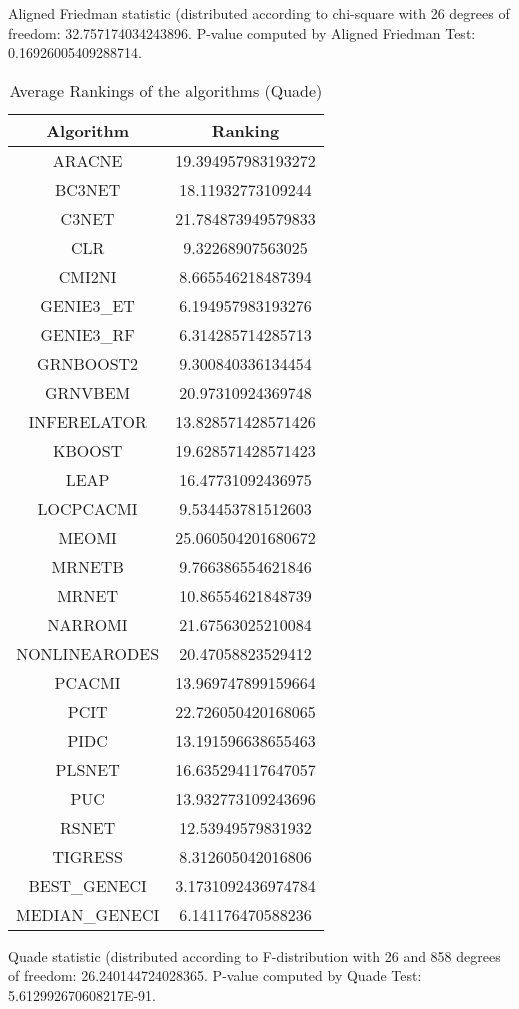 \documentclass[a4paper,10pt]{article}
\begin{document}
\begin{landscape}
Aligned Friedman statistic (distributed according to chi-square with 26 degrees of freedom: 32.757174034243896. 
P-value computed by Aligned Friedman Test: 0.16926005409288714.\newline


\newpage

\begin{table}[!htp]
\centering
\caption{Average Rankings of the algorithms (Quade)
}\begin{tabular}{c|c}
Algorithm&Ranking\\
\hline
ARACNE&19.394957983193272\\
BC3NET&18.11932773109244\\
C3NET&21.784873949579833\\
CLR&9.32268907563025\\
CMI2NI&8.665546218487394\\
GENIE3_ET&6.194957983193276\\
GENIE3_RF&6.314285714285713\\
GRNBOOST2&9.300840336134454\\
GRNVBEM&20.97310924369748\\
INFERELATOR&13.828571428571426\\
KBOOST&19.628571428571423\\
LEAP&16.47731092436975\\
LOCPCACMI&9.534453781512603\\
MEOMI&25.060504201680672\\
MRNETB&9.766386554621846\\
MRNET&10.86554621848739\\
NARROMI&21.67563025210084\\
NONLINEARODES&20.47058823529412\\
PCACMI&13.969747899159664\\
PCIT&22.726050420168065\\
PIDC&13.191596638655463\\
PLSNET&16.635294117647057\\
PUC&13.932773109243696\\
RSNET&12.53949579831932\\
TIGRESS&8.312605042016806\\
BEST_GENECI&3.1731092436974784\\
MEDIAN_GENECI&6.141176470588236\\
\end{tabular}
\end{table}
Quade statistic (distributed according to F-distribution with 26 and 858 degrees of freedom: 26.240144724028365. 
P-value computed by Quade Test: 5.612992670608217E-91.\newline



\end{landscape}
\end{document}
